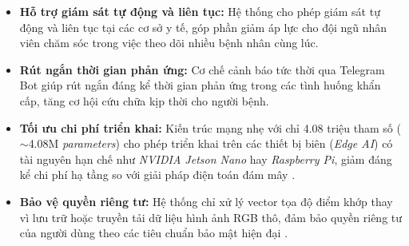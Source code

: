 \begin{itemize}
    \item[(1)] \textbf{Hỗ trợ giám sát tự động và liên tục:} Hệ thống cho phép giám sát tự động và liên tục tại các cơ sở y tế, góp phần giảm áp lực cho đội ngũ nhân viên chăm sóc trong việc theo dõi nhiều bệnh nhân cùng lúc.
    
    \item[(2)] \textbf{Rút ngắn thời gian phản ứng:} Cơ chế cảnh báo tức thời qua Telegram Bot giúp rút ngắn đáng kể thời gian phản ứng trong các tình huống khẩn cấp, tăng cơ hội cứu chữa kịp thời cho người bệnh.
    
    \item[(3)] \textbf{Tối ưu chi phí triển khai:} Kiến trúc mạng nhẹ với chỉ 4.08 triệu tham số ($\sim$4.08M \textit{parameters}) cho phép triển khai trên các thiết bị biên (\textit{Edge AI}) có tài nguyên hạn chế như \textit{NVIDIA Jetson Nano} hay \textit{Raspberry Pi}, giảm đáng kể chi phí hạ tầng so với giải pháp điện toán đám mây \cite{benabdennour2026real, pham2025lightweight}.
    
    \item[(4)] \textbf{Bảo vệ quyền riêng tư:} Hệ thống chỉ xử lý vector tọa độ điểm khớp thay vì lưu trữ hoặc truyền tải dữ liệu hình ảnh RGB thô, đảm bảo quyền riêng tư của người dùng theo các tiêu chuẩn bảo mật hiện đại \cite{tang2025privacy, wang2024privacy}.
\end{itemize}

